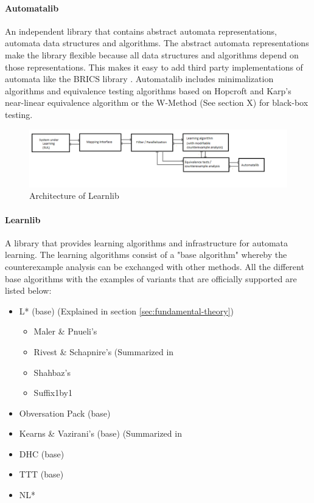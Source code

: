 \documentclass[multi,crop=false,class=article]{standalone}
\begin{document}
\paragraph{Automatalib} An independent library that contains abstract 
automata representations, automata data structures and algorithms. The abstract 
automata representations make the library flexible because all data structures
and algorithms depend on those representations. This makes it easy to add 
third party implementations of automata like the BRICS library 
\cite{Alur2005}. Automatalib includes minimalization 
algorithms and equivalence testing algorithms based on Hopcroft and Karp's 
near-linear equivalence algorithm \cite{hopcroft1971} or the W-Method 
(See section X) %
for black-box testing. 

\begin{figure}[!ht]
	\includegraphics[width=\textwidth]{Tool_images/learnlib_architecture.png}
	\caption{Architecture of Learnlib}
	\label{fig:learnlib_arch}
\end{figure}

\paragraph{Learnlib} A library that provides learning algorithms and 
infrastructure for automata learning. The learning algorithms consist of a 
"base algorithm" whereby the counterexample analysis can be exchanged with 
other methods. All the different base algorithms with the examples of variants 
that are officially supported are listed below:

\begin{itemize}
	\item L* (base) (Explained in section \ref{sec:fundamental-theory})
	\begin{itemize}
		\item Maler \& Pnueli's \cite{Maler1995}
		\item Rivest \& Schapnire's (Summarized in 
		\item Shahbaz's \cite{Shahbaz2009}
		\item Suffix1by1 \cite{irfan2010}
	\end{itemize}
	\item Obversation Pack (base) \cite{howar2012a}
	\item Kearns \& Vazirani's (base) (Summarized in 
	\item DHC (base) \cite{Merten2012}
	\item TTT (base) %
	\item NL* \cite{Bollig2010}
\end{itemize}
\end{document}
